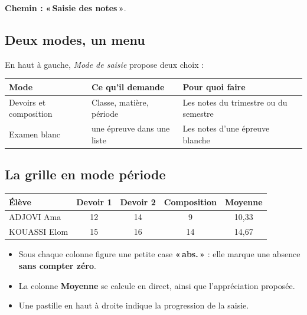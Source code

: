 \documentclass[11pt,a4paper]{article}
\newcommand{\menu}[1]{\textbf{«\,#1\,»}}
\newcommand{\champ}[1]{\textit{#1}}
\begin{document}
\textbf{Chemin :} \menu{Saisie des notes}.

\subsection{Deux modes, un menu}

En haut à gauche, \champ{Mode de saisie} propose deux choix :

\begin{center}
\renewcommand{\arraystretch}{1.25}
\begin{tabularx}{\textwidth}{@{} >{\raggedright}p{4.6cm} >{\raggedright}p{4.4cm} X@{}}
\toprule
\textbf{Mode} & \textbf{Ce qu'il demande} & \textbf{Pour quoi faire} \\
\midrule
Devoirs et composition & Classe, matière, période & Les notes du trimestre ou du semestre \\
Examen blanc & une épreuve dans une liste & Les notes d'une épreuve blanche \\
\bottomrule
\end{tabularx}
\end{center}

\subsection{La grille en mode période}

\begin{center}
\renewcommand{\arraystretch}{1.3}
\begin{tabular}{@{}lcccc@{}}
\toprule
\textbf{Élève} & \textbf{Devoir 1} & \textbf{Devoir 2} & \textbf{Composition} & \textbf{Moyenne} \\
\midrule
ADJOVI Ama & 12 & 14 & 9 & 10,33 \\
KOUASSI Elom & 15 & 16 & 14 & 14,67 \\
\bottomrule
\end{tabular}
\end{center}

\begin{itemize}
  \item Sous chaque colonne figure une petite case \menu{abs.} : elle marque une
        absence \textbf{sans compter zéro}.
  \item La colonne \textbf{Moyenne} se calcule en direct, ainsi que
        l'appréciation proposée.
  \item Une pastille en haut à droite indique la progression de la saisie.
\end{itemize}
\end{document}
